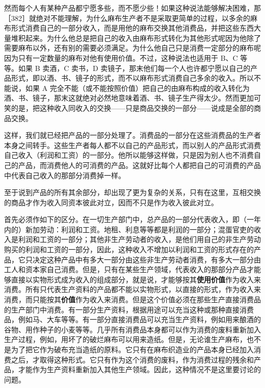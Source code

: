 然而每个人有某种产品都宁愿多些，而不愿少些！如果这种说法能够解决困难，那［382］就绝对不能理解，为什么麻布生产者不是采取更简单的过程，以多余的麻布形式消费自己的一部分收入，而是用他的麻布交换其他消费品，并把这些东西大量堆积起来。为什么他总是把自己的收入由麻布形式转化为其他形式呢因为他除了需要麻布以外，还有别的需要必须满足。为什么他自己只是消费一定部分的麻布呢因为只有一定数量的麻布对他有使用价值。不过，这种说法也适用于 B、C 等等。如果 B 卖酒，C 卖书，D 卖镜子，那末他们每一个人也许都宁愿以自己的产品形式，即以酒、书、镜子的形式，而不以麻布形式消费自己多余的收入。所以不能说，如果 A 完全不能（或不能按照价值）把自己的由麻布构成的收入转化为酒、书、镜子，那末这就绝对必然地意味着酒、书、镜子生产得太少。然而更加可笑的是，把这种收入同收入的交换——只是商品交换的一部分——说成是全部的商品交换。

这样，我们就已经把产品的一部分处理了。消费品的一部分在这些消费品的生产者本身之间转手。这些生产者每人都不以自己的产品形式，而以别人的产品形式消费自己收入（利润和工资）的一部分。他所以能够这样做，只是因为别人也不消费自己的产品，而消费他人的可消费的产品。这就好比每个人都把自己的可消费的产品中代表自己收入的那部分消费掉一样。

至于说到产品的所有其余部分，却出现了更为复杂的关系，只有在这里，互相交换的商品才作为收入同资本彼此对立，因而不只是作为收入彼此对立。

首先必须作如下的区分。在一切生产部门中，总产品的一部分代表收入，即（一年内的）新加劳动：利润和工资。\fontbox{~\{}地租、利息等等都是利润的一部分；混蛋官吏的收入是利润和工资的一部分；其他非生产劳动者的收入，是他们用自己的非生产劳动购买的利润和工资的一部分，因此，这种收入不增加以利润和工资的形式存在的产品，它只决定这种产品中有多大一部分由这些非生产劳动者消费，有多大一部分由工人和资本家自己消费。\fontbox{\}~}但是，只有在某些生产领域，代表收入的那部分产品才能够直接以实物形式成为收入的组成部分，就是说，才能够按其\textbf{使用价值}作为收入来消费。所有只代表生产资料的产品都不能以实物形式，以直接的形式，作为收入来消费，而只能按其\textbf{价值}作为收入来消费。但是这个价值必须在那些生产直接消费品的生产部门中消费。有一部分生产资料，根据用途可以充当这种或那种直接消费品，例如马、大车等等。有一部分直接消费品可以充当生产资料，例如用来酿酒的谷物、用作种子的小麦等等。几乎所有消费品本身都可以作为消费的废料重新加入生产过程，例如，用坏了的破烂麻布可以用来造纸。但是，无论谁生产麻布，也不是为了把它作为破布充当造纸的原料。它只有在麻布织造业的产品本身已经加入消费之后，才取得这种形式。它只有作为这个消费的废料，作为消费过程的残余和产品，才能作为生产资料重新加入其他生产领域。因此，这种情况不是这里要讨论的问题。


